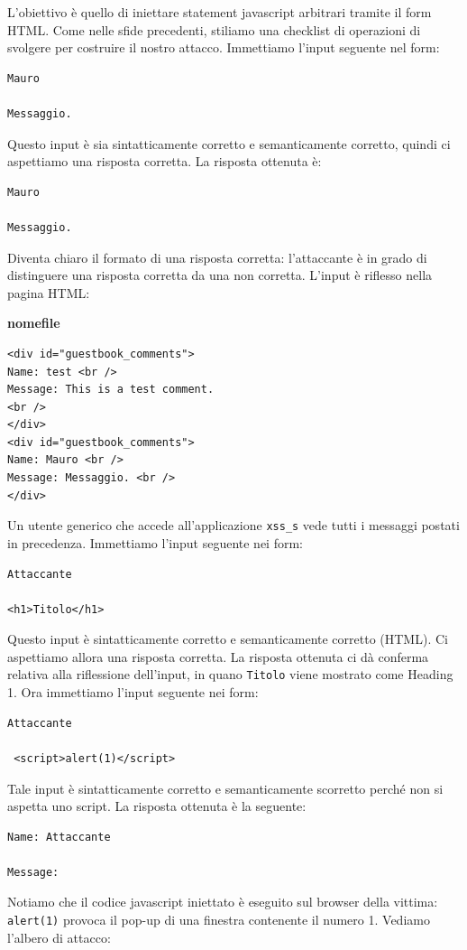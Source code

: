 L'obiettivo è quello di iniettare statement javascript arbitrari tramite il form HTML. Come nelle sfide precedenti, stiliamo una checklist di operazioni di svolgere per costruire il nostro attacco. Immettiamo l'input seguente nel form:
\begin{lstlisting}
Mauro

Messaggio.
\end{lstlisting}
Questo input è sia sintatticamente corretto e semanticamente corretto, quindi ci aspettiamo una risposta corretta. La risposta ottenuta è:
\begin{lstlisting}
Mauro

Messaggio.
\end{lstlisting}
Diventa chiaro il formato di una risposta corretta: l'attaccante è in grado di distinguere una risposta corretta da una non corretta. L'input è riflesso nella pagina HTML:
\begin{mdframed}[backgroundcolor=white!20,shadow=false]
\textbf{nomefile}
\begin{verbatim}
<div id="guestbook_comments">
Name: test <br />
Message: This is a test comment.
<br />
</div>
<div id="guestbook_comments">
Name: Mauro <br />
Message: Messaggio. <br />
</div> 

\end{verbatim}
\end{mdframed}
Un utente generico che accede all'applicazione \texttt{xss\_s} vede tutti i messaggi postati in precedenza. Immettiamo l'input seguente nei form:
\begin{lstlisting}
Attaccante

<h1>Titolo</h1>
\end{lstlisting}
Questo input è sintatticamente corretto e semanticamente corretto (HTML). Ci aspettiamo allora una risposta corretta. La risposta ottenuta ci dà conferma relativa alla riflessione dell'input, in quano \texttt{Titolo} viene mostrato come Heading 1. Ora immettiamo l'input seguente nei form:
\begin{lstlisting}
Attaccante

 <script>alert(1)</script>
\end{lstlisting}
Tale input è sintatticamente corretto e semanticamente scorretto perché non si aspetta uno script. La risposta ottenuta è la seguente:
\begin{lstlisting}
Name: Attaccante

Message:
\end{lstlisting}
Notiamo che il codice javascript iniettato è eseguito sul browser della vittima: \texttt{alert(1)} provoca il pop-up di una finestra contenente il numero 1. Vediamo l'albero di attacco:

